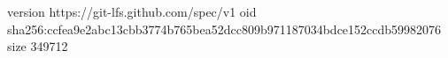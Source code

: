 version https://git-lfs.github.com/spec/v1
oid sha256:ccfea9e2abc13cbb3774b765bea52dcc809b971187034bdce152ccdb59982076
size 349712
